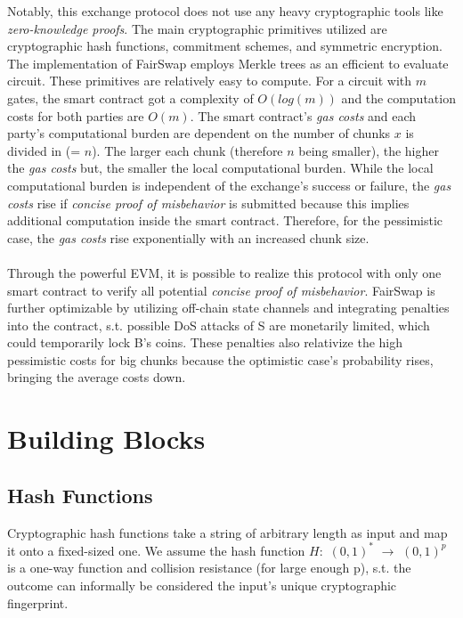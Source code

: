 \documentclass{cacthesis}
\newcounter{protocol}
\begin{document}
        Notably, this exchange protocol does not use any heavy cryptographic tools like \textit{zero-knowledge proofs}. The main cryptographic primitives utilized are cryptographic hash functions, commitment schemes, and symmetric encryption. The implementation of FairSwap employs Merkle trees as an efficient to evaluate circuit. These primitives are relatively easy to compute. For a circuit with $m$ gates, the smart contract got a complexity of $O(log(m))$ and the computation costs for both parties are $O(m)$. The smart contract's \textit{gas costs} and each party's computational burden are dependent on the number of chunks $x$ is divided in (= $n$). The larger each chunk (therefore $n$ being smaller), the higher the \textit{gas costs} but, the smaller the local computational burden. While the local computational burden is independent of the exchange's success or failure, the \textit{gas costs} rise if \textit{concise proof of misbehavior} is submitted because this implies additional computation inside the smart contract. Therefore, for the pessimistic case, the \textit{gas costs} rise exponentially with an increased chunk size. \\\\
        Through the powerful EVM, it is possible to realize this protocol with only one smart contract to verify all potential \textit{concise proof of misbehavior}.
        FairSwap is further optimizable by utilizing off-chain state channels and integrating penalties into the contract, s.t. possible DoS attacks of S are monetarily limited, which could temporarily lock B's coins. These penalties also relativize the high pessimistic costs for big chunks because the optimistic case's probability rises, bringing the average costs down.
                
        \section{Building Blocks}
	        \subsection{Hash Functions}
	        \label{sub:HashFunctions}
	        Cryptographic hash functions take a string of arbitrary length as input and map it onto a fixed-sized one. We assume the hash function $H:$ $ (0, 1)^*$ $\rightarrow$ $(0, 1)^p$  is a one-way function and collision resistance (for large enough p), s.t. the outcome can informally be considered the input's unique cryptographic fingerprint. 
\end{document}
